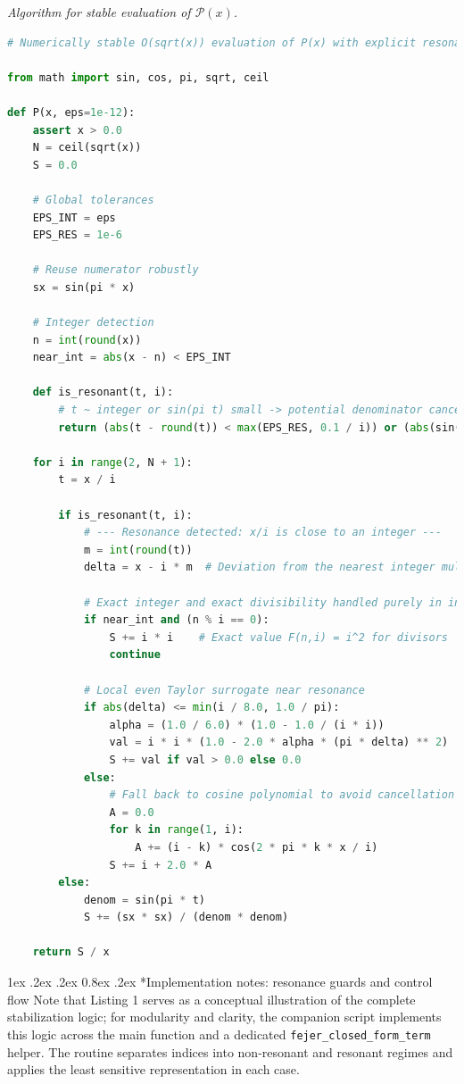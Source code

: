\documentclass[11pt,a4paper]{amsart}
\makeatletter
\renewcommand\paragraph{\@startsection{paragraph}{4}{\z@}%
  {1ex \@plus .2ex \@minus .2ex}%
  {0.8ex \@plus .2ex}%
  {\normalfont\bfseries}}
\theoremstyle{plain}
\theoremstyle{definition}
\theoremstyle{remark}
\makeatother
\begin{document}
\noindent\textit{Algorithm for stable evaluation of $\mathcal{P}(x)$.}
\begin{lstlisting}[language=Python]
# Numerically stable O(sqrt(x)) evaluation of P(x) with explicit resonance guards (hardened).

from math import sin, cos, pi, sqrt, ceil

def P(x, eps=1e-12):
    assert x > 0.0
    N = ceil(sqrt(x))
    S = 0.0

    # Global tolerances
    EPS_INT = eps
    EPS_RES = 1e-6

    # Reuse numerator robustly
    sx = sin(pi * x)

    # Integer detection
    n = int(round(x))
    near_int = abs(x - n) < EPS_INT

    def is_resonant(t, i):
        # t ~ integer or sin(pi t) small -> potential denominator cancellation
        return (abs(t - round(t)) < max(EPS_RES, 0.1 / i)) or (abs(sin(pi * t)) < EPS_RES)

    for i in range(2, N + 1):
        t = x / i

        if is_resonant(t, i):
            # --- Resonance detected: x/i is close to an integer ---
            m = int(round(t))
            delta = x - i * m  # Deviation from the nearest integer multiple of i

            # Exact integer and exact divisibility handled purely in integer arithmetic
            if near_int and (n % i == 0):
                S += i * i    # Exact value F(n,i) = i^2 for divisors
                continue

            # Local even Taylor surrogate near resonance
            if abs(delta) <= min(i / 8.0, 1.0 / pi):
                alpha = (1.0 / 6.0) * (1.0 - 1.0 / (i * i))
                val = i * i * (1.0 - 2.0 * alpha * (pi * delta) ** 2)
                S += val if val > 0.0 else 0.0
            else:
                # Fall back to cosine polynomial to avoid cancellation
                A = 0.0
                for k in range(1, i):
                    A += (i - k) * cos(2 * pi * k * x / i)
                S += i + 2.0 * A
        else:
            denom = sin(pi * t)
            S += (sx * sx) / (denom * denom)

    return S / x
\end{lstlisting}

\paragraph*{Implementation notes: resonance guards and control flow}
Note that Listing 1 serves as a conceptual illustration of the complete stabilization logic; for modularity and clarity, the companion script implements this logic across the main function and a dedicated \texttt{fejer\_closed\_form\_term} helper. The routine separates indices into non-resonant and resonant regimes and applies the least sensitive representation in each case.
\end{document}
